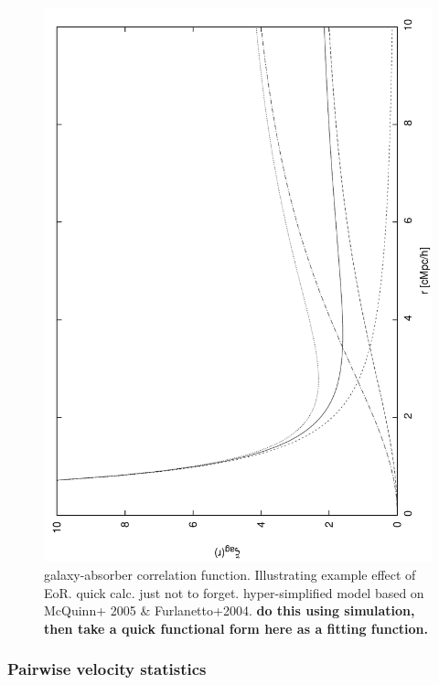 \documentclass[useAMS,usenatbib,twocolumn]{mn2e}
\begin{document}
\begin{figure}
 \begin{center}
  \includegraphics[angle=-90,width=\columnwidth]{figure/xi_example_EoR.pdf}
  \caption{galaxy-absorber correlation function. Illustrating example 
   effect of EoR. quick calc. just not to forget. 
   hyper-simplified model based on McQuinn+ 2005 \& Furlanetto+2004.
   \textbf{do this using simulation, then take a quick functional form here
   as a fitting function.}}
   \label{EoR_xi}
 \end{center}
\end{figure}



\subsubsection{Pairwise velocity statistics}
\end{document}
